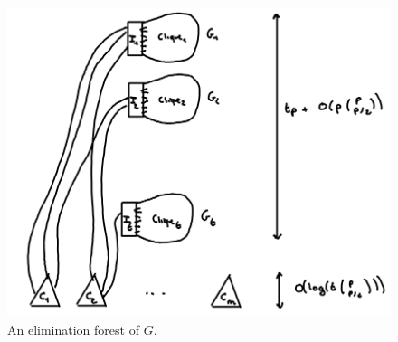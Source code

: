\begin{figure}
    \centering
    \includegraphics[width=.6\textwidth]{figures/indset-elimination-forest.png}
    \caption{An elimination forest of $G$.}
    \label{fig:indset-elimination-forest}
\end{figure}
